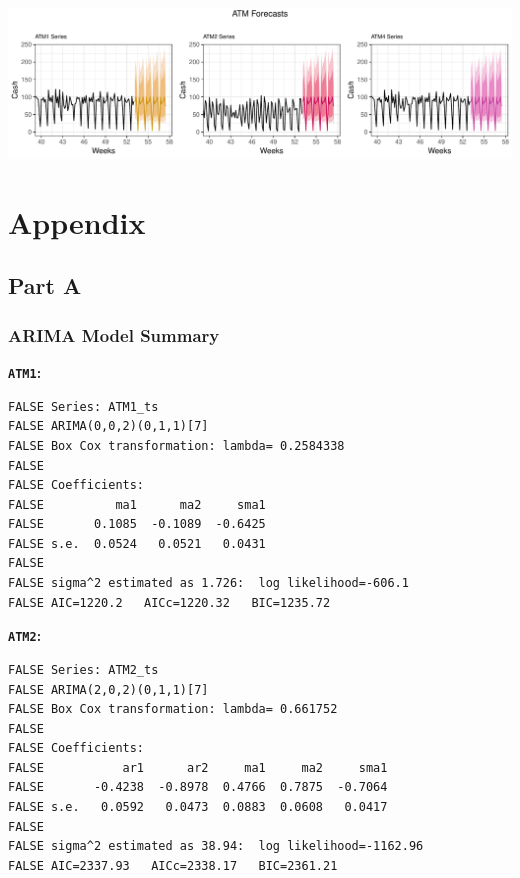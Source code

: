 \documentclass[openany]{book}
\begin{document}
\includegraphics{Part-A-JM_files/figure-latex/unnamed-chunk-7-1.pdf}

\hypertarget{Appendix}{%
\chapter*{Appendix}\label{Appendix}}

\hypertarget{Part-A}{%
\section*{Part A}\label{Part-A}}

\hypertarget{Part-A-arima}{%
\subsection*{ARIMA Model Summary}\label{Part-A-arima}}

\textbf{\texttt{ATM1}:}

\begin{verbatim}
FALSE Series: ATM1_ts 
FALSE ARIMA(0,0,2)(0,1,1)[7] 
FALSE Box Cox transformation: lambda= 0.2584338 
FALSE 
FALSE Coefficients:
FALSE          ma1      ma2     sma1
FALSE       0.1085  -0.1089  -0.6425
FALSE s.e.  0.0524   0.0521   0.0431
FALSE 
FALSE sigma^2 estimated as 1.726:  log likelihood=-606.1
FALSE AIC=1220.2   AICc=1220.32   BIC=1235.72
\end{verbatim}

\textbf{\texttt{ATM2}:}

\begin{verbatim}
FALSE Series: ATM2_ts 
FALSE ARIMA(2,0,2)(0,1,1)[7] 
FALSE Box Cox transformation: lambda= 0.661752 
FALSE 
FALSE Coefficients:
FALSE           ar1      ar2     ma1     ma2     sma1
FALSE       -0.4238  -0.8978  0.4766  0.7875  -0.7064
FALSE s.e.   0.0592   0.0473  0.0883  0.0608   0.0417
FALSE 
FALSE sigma^2 estimated as 38.94:  log likelihood=-1162.96
FALSE AIC=2337.93   AICc=2338.17   BIC=2361.21
\end{verbatim}
\end{document}
